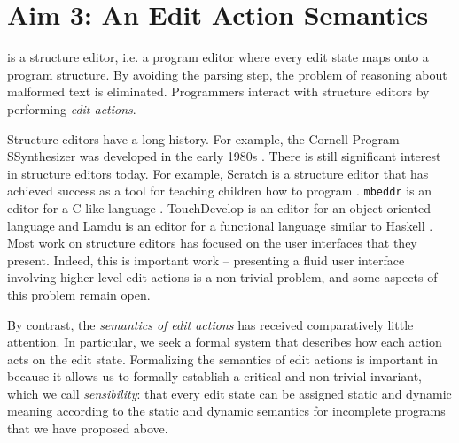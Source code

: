 \section{Aim 3: An Edit Action Semantics}\label{sec:actions}

\HazelEnv is a structure editor, i.e. a 
program editor where every edit state maps onto a program structure. By
avoiding the parsing step, the problem of reasoning about malformed text is
eliminated.  Programmers interact with structure editors by performing
\emph{edit actions}.

Structure editors have a long history. For example, the Cornell Program
SSynthesizer was developed in the early 1980s \citep{teitelbaum_cornell_1981}. There is still significant   
 interest in structure editors today. For example,  Scratch is a 
structure editor that has achieved success as a tool for teaching children
how to program \citep{Resnick:2009:SP:1592761.1592779}. \texttt{mbeddr} is an editor for a C-like
language \citep{voelter_mbeddr:_2012}. TouchDevelop is an editor for an
object-oriented language \citep{tillmann_touchdevelop:_2011} and Lamdu is an
editor for a functional language similar to Haskell \citep{lamdu}. Most work on structure editors has focused on the user
interfaces that they present. Indeed, this is important work -- presenting a
fluid user interface involving higher-level edit actions is a non-trivial
problem, and some aspects of this problem remain open.

By contrast, the \emph{semantics of edit actions} has received comparatively little
attention. In particular, we seek a formal system that describes how each action acts on the edit
state. 
Formalizing the semantics of edit actions is important in \HazelEnv
because it allows us to formally establish a critical and non-trivial invariant,
which we call \emph{sensibility}: that every edit state can be assigned static
and dynamic meaning according to the static and dynamic semantics for incomplete
programs that we have proposed above. 


